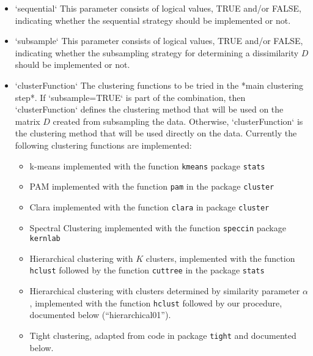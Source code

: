 \begin{itemize}
\item `sequential` This parameter consists of logical values, TRUE and/or FALSE, indicating whether the sequential strategy should be implemented or not. 
\item `subsample` This parameter consists of logical values, TRUE and/or FALSE, indicating whether the subsampling strategy for determining a dissimilarity $D$ should be implemented or not. 
\item `clusterFunction` The clustering functions to be tried in the *main clustering step*. If `subsample=TRUE` is part of the combination, then `clusterFunction` defines the clustering method that will be used on the matrix $D$ created from subsampling the data. Otherwise, `clusterFunction` is the clustering method that will be used directly on the data. Currently the following clustering functions are implemented:
\begin{itemize}
	\item k-means implemented with the function \texttt{kmeans} package \texttt{stats}
	\item PAM implemented with the function \texttt{pam} in the package \texttt{cluster}
	\item Clara implemented with the function \texttt{clara} in package \texttt{cluster}
	\item Spectral Clustering implemented with the function \texttt{speccin} package \texttt{kernlab}
	\item Hierarchical clustering with $K$ clusters, implemented with the function \texttt{hclust} followed by the function \texttt{cuttree} in the package \texttt{stats}
	\item Hierarchical clustering with clusters determined by similarity parameter $\alpha$, implemented with the function \texttt{hclust} followed by our procedure, documented below (``hierarchical01'').
	\item Tight clustering, adapted from code in package \texttt{tight} and documented below.

	\end{itemize}
	

\end{itemize}
